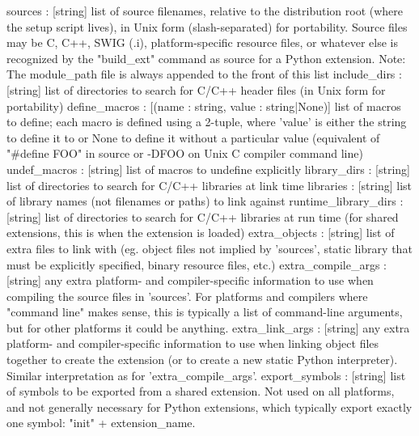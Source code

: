 \begin{DoxyVerb}
    sources : [string]
      list of source filenames, relative to the distribution root
      (where the setup script lives), in Unix form (slash-separated)
      for portability.  Source files may be C, C++, SWIG (.i),
      platform-specific resource files, or whatever else is recognized
      by the "build_ext" command as source for a Python extension.
      Note: The module_path file is always appended to the front of this
            list
    include_dirs : [string]
      list of directories to search for C/C++ header files (in Unix
      form for portability)
    define_macros : [(name : string, value : string|None)]
      list of macros to define; each macro is defined using a 2-tuple,
      where 'value' is either the string to define it to or None to
      define it without a particular value (equivalent of "#define
      FOO" in source or -DFOO on Unix C compiler command line)
    undef_macros : [string]
      list of macros to undefine explicitly
    library_dirs : [string]
      list of directories to search for C/C++ libraries at link time
    libraries : [string]
      list of library names (not filenames or paths) to link against
    runtime_library_dirs : [string]
      list of directories to search for C/C++ libraries at run time
      (for shared extensions, this is when the extension is loaded)
    extra_objects : [string]
      list of extra files to link with (eg. object files not implied
      by 'sources', static library that must be explicitly specified,
      binary resource files, etc.)
    extra_compile_args : [string]
      any extra platform- and compiler-specific information to use
      when compiling the source files in 'sources'.  For platforms and
      compilers where "command line" makes sense, this is typically a
      list of command-line arguments, but for other platforms it could
      be anything.
    extra_link_args : [string]
      any extra platform- and compiler-specific information to use
      when linking object files together to create the extension (or
      to create a new static Python interpreter).  Similar
      interpretation as for 'extra_compile_args'.
    export_symbols : [string]
      list of symbols to be exported from a shared extension.  Not
      used on all platforms, and not generally necessary for Python
      extensions, which typically export exactly one symbol: "init" +
      extension_name.
\end{DoxyVerb}
 \hypertarget{namespacescipy_1_1weave_1_1build__tools_a6a65c1c7c44bdad69c2c2a35993c304c}{}
